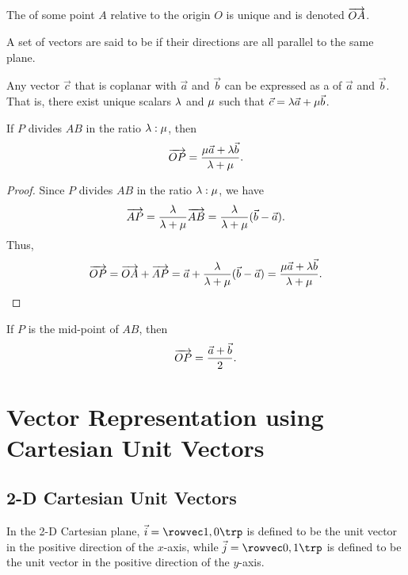 \begin{definition}
    The  of some point $A$ relative to the origin $O$ is unique and is denoted $\overrightarrow{OA}$.
\end{definition}

\begin{definition}
    A set of vectors are said to be  if their directions are all parallel to the same plane.
\end{definition}

\begin{fact}
    Any vector $\vec c$ that is coplanar with $\vec a$ and $\vec b$ can be expressed as a  of $\vec a$ and $\vec b$. That is, there exist unique scalars $\lambda$ and $\mu$ such that $\vec c = \lambda \vec a + \mu \vec b$.
\end{fact}

\begin{theorem}
    If $P$ divides $AB$ in the ratio $\lambda : \mu$, then \[\overrightarrow{OP} = \frac{\mu \vec a + \lambda \vec b}{\lambda + \mu}.\]
\end{theorem}
\begin{proof}
    Since $P$ divides $AB$ in the ratio $\lambda : \mu$, we have \[\overrightarrow{AP} = \frac{\lambda}{\lambda + \mu} \overrightarrow{AB} = \frac{\lambda}{\lambda + \mu} (\vec b - \vec a).\] Thus, \[\overrightarrow{OP} = \overrightarrow{OA} + \overrightarrow{AP} = \vec a + \frac{\lambda}{\lambda + \mu} (\vec b - \vec a) = \frac{\mu \vec a + \lambda \vec b}{\lambda + \mu}.\]
\end{proof}

\begin{corollary}
    If $P$ is the mid-point of $AB$, then \[\overrightarrow{OP} = \frac{\vec a + \vec b}{2}.\]
\end{corollary}

\section{Vector Representation using Cartesian Unit Vectors}\label{sec:vector-cartesian}

\subsection{2-D Cartesian Unit Vectors}

\begin{definition}
    In the 2-D Cartesian plane, $\vec i = \cveciix10$ is defined to be the unit vector in the positive direction of the $x$-axis, while $\vec j = \cveciix01$ is defined to be the unit vector in the positive direction of the $y$-axis.
\end{definition}

